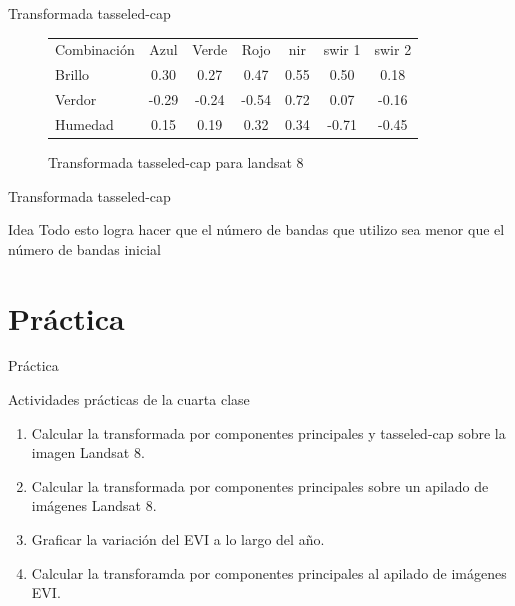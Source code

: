 \documentclass[handout]{beamer}
\begin{document}
\begin{frame}{Transformada tasseled-cap}
    \begin{figure}
      \begin{tabular}{l c c c c c c }
        Combinación  & Azul & Verde & Rojo & nir & swir 1 & swir 2\\
        Brillo &  0.30  & 0.27  & 0.47  & 0.55  & 0.50  & 0.18\\
        Verdor & -0.29  &-0.24  &-0.54  & 0.72 & 0.07  &-0.16\\
        Humedad&  0.15  & 0.19  & 0.32  & 0.34  &-0.71  &-0.45
      \end{tabular}
      \caption{Transformada tasseled-cap para landsat 8 }
    \end{figure}
\end{frame}

\begin{frame}{Transformada tasseled-cap}
  \begin{block}{Idea}
    Todo esto logra hacer que el número de bandas que utilizo sea menor que el
      número de bandas inicial
  \end{block}
\end{frame}

\section{Práctica}

\begin{frame}{Práctica}
  \begin{exampleblock}{Actividades prácticas de la cuarta clase}
    \begin{enumerate}
      \item Calcular la transformada por componentes principales y tasseled-cap sobre la imagen Landsat 8.
      \item Calcular la transformada por componentes principales sobre un apilado de imágenes Landsat 8.
      \item Graficar la variación del EVI a lo largo del año.
      \item Calcular la transforamda por componentes principales al apilado de imágenes EVI.
    \end{enumerate}
  \end{exampleblock}
\end{frame}
\end{document}
